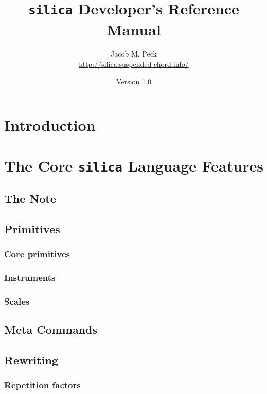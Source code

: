 \documentclass{book}
\begin{document}
\title{\texttt{silica} Developer's Reference Manual}
\author{Jacob M. Peck\\\url{http://silica.suspended-chord.info/}}
\date{Version 1.0}
\maketitle \pagebreak

\tableofcontents
\pagebreak

\part{Introduction}

\part{The Core \texttt{silica} Language Features}

\chapter{The Note}

\chapter{Primitives}
\section{Core primitives}

\section{Instruments}

\section{Scales}


\chapter{Meta Commands}

\chapter{Rewriting}
\section{Repetition factors}
\end{document}
